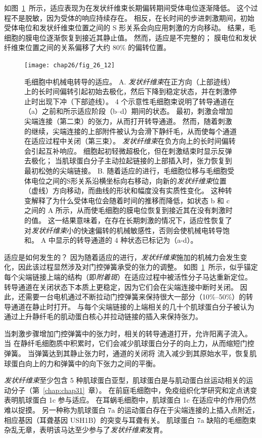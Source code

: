 如图~\ref{fig:26_12}~所示，适应表现为在发状纤维束长期偏转期间受体电位逐渐降低。
这个过程不是脱敏，因为受体的响应持续存在。
相反，在长时间的步进刺激期间，初始受体电位和发状纤维束位置之间的 S 形关系会向应用刺激的方向移动。
结果，毛细胞的膜电位逐渐恢复到接近其静止值。
然而，适应是不完整的；
膜电位和发状纤维束位置之间的关系偏移了大约 80\% 的偏转位置。


\begin{figure}[htbp]
	\centering
	\texttt{[image: chap26/fig\_26\_12]}
	\caption{毛细胞中机械电转导的适应。
		A. \textit{发状纤维束}在正方向（上部迹线）上的长时间偏转引起初始去极化，然后下降到稳定状态，并在刺激停止时出现下冲（下部迹线）。
		4 个示意性毛细胞束说明了转导通道在（a）之前和所示适应阶段（b–d）期间的状态。
		最初，刺激会增加尖端连接（第二束）的张力，从而打开转导通道。
		然而，随着刺激的继续，尖端连接的上部附件被认为会滑下静纤毛，从而使每个通道在适应过程中关闭（第三束）。
		\textit{发状纤维束}在负方向上的长时间偏转会引起互补响应。
		细胞起初轻微超极化，但在刺激结束时显示反弹去极化；
		当肌球蛋白分子主动拉起链接的上部插入时，张力恢复到最初松弛的尖端链接。
		B. 随着适应的进行，毛细胞位移与毛细胞受体电位之间的S形关系沿横坐标向右移动，向新的\textit{发状纤维束}位置（虚线）方向移动，而曲线的形状和幅度没有实质性变化。
		这种转变解释了为什么受体电位会随着时间的推移而降低，如状态 b 和 c 之间的 A 所示，从而使毛细胞的膜电位恢复到接近其在没有刺激时的值。
		这一结果意味着，在存在长期刺激的情况下，适应性恢复了对\textit{发状纤维束}小的快速偏转的机械敏感性，否则会使机械电转导饱和。
		A 中显示的转导通道的 4 种状态已标记为（a-d）\cite{hudspeth1994pulling}。}
	\label{fig:26_12}
\end{figure}


适应是如何发生的？
因为随着适应的进行，\textit{发状纤维束}施加的机械力会发生变化，因此该过程显然涉及对门控弹簧承受的张力的调整。
如图~\ref{fig:26_12}~所示，似乎锚定每个尖端链接上端的结构（即\textit{附着斑}）在适应过程中被活性分子马达重新定位。
转导通道在关闭状态下本质上更稳定，因为它们会在尖端连接中断时关闭。
因此，还需要一台电机通过不断拉动门控弹簧来保持很大一部分（10\%–50\%）的转导通道在静止时打开。
与每个尖端链接的上端相关的几十个肌球蛋白分子被认为通过上升静纤毛的肌动蛋白核心并拉动链接的插入来保持张力。


当刺激步骤增加门控弹簧中的张力时，相关的转导通道打开，允许阳离子流入。
当  在静纤毛细胞质中积累时，它们会减少肌球蛋白分子的向上力，从而缩短门控弹簧。
当弹簧达到其静止张力时，通道的关闭将  流入减少到其原始水平，恢复肌球蛋白向上的力和弹簧中的向下张力之间的平衡。


\textit{发状纤维束}至少包含 5 种肌球蛋白亚型，肌球蛋白是与肌动蛋白丝运动相关的运动分子（第~\ref{chap:chap31}~章）。
在前庭毛细胞中，免疫组织化学研究和定点诱变表明肌球蛋白 1c 参与适应。
在耳蜗毛细胞中，肌球蛋白 1c 在适应中的作用仍然难以捉摸。
另一种称为肌球蛋白 7a 的运动蛋白存在于尖端连接的上插入点附近，相应基因（耳聋基因 USH1B）的突变与耳聋有关。
肌球蛋白 7a 缺陷的毛细胞束杂乱无章，表明该马达至少参与了\textit{发状纤维束}发育。


